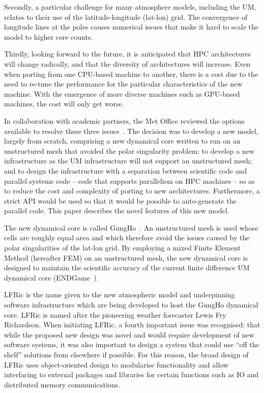 \documentclass[review,times]{elsarticle}
\begin{document}
Secondly, a particular challenge for many atmosphere models, including
the UM, relates to their use of the latitude-longitude (lat-lon) grid.
The convergence of longitude lines at the poles causes numerical
issues that make it hard to scale the model to higher core counts.

Thirdly, looking forward to the future, it is anticipated that HPC
architectures will change radically, and that the diversity of
architectures will increase. Even when porting from one CPU-based
machine to another, there is a cost due to the need to re-tune the
performance for the particular characteristics of the new
machine. With the emergence of more diverse machines such as GPU-based
machines, the cost will only get worse.

In collaboration with academic partners, the Met Office reviewed the
options available to resolve these three issues~\cite{GHP1_CSR}. The
decision was to develop a new model, largely from scratch, comprising
a new dynamical core written to run on an unstructured mesh that
avoided the polar singularity problem; to develop a new infrastructure
as the UM infrastructure will not support an unstructured mesh; and to
design the infrastructure with a separation between scientific code
and parallel systems code -- code that supports parallelism on HPC
machines -- so as to reduce the cost and complexity of porting to new
architectures. Furthermore, a strict API would be used so that it
would be possible to auto-generate the parallel code. This paper
describes the novel features of this new model.

The new dynamical core is called GungHo~\cite{melvin2018}. An
unstructured mesh is used whose cells are roughly equal area and which
therefore avoid the issues caused by the polar singularities of the
lat-lon grid. By employing a mixed Finite Element Method (hereafter
FEM) on an unstructured mesh, the new dynamical core is designed to
maintain the scientific accuracy of the current finite difference UM
dynamical core (ENDGame~\cite{QJ:QJ2235}).

LFRic is the name given to the new atmospheric model and underpinning
software infrastructure which are being developed to host the GungHo
dynamical core. LFRic is named after the pioneering weather forecaster
Lewis Fry Richardson. When initiating LFRic, a fourth important issue
was recognised: that while the proposed new design was novel and would
require development of new software systems, it was also important to
design a system that could use ``off the shelf'' solutions from
elsewhere if possible. For this reason, the broad design of LFRic uses
object-oriented design to modularise functionality and allow
interfacing to external packages and libraries for certain functions
such as IO and distributed memory communications.
\end{document}
